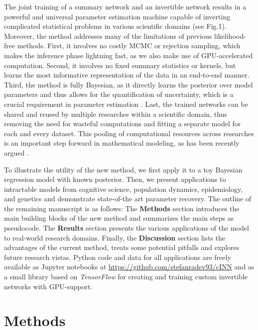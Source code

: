 \documentclass[9pt,twoside,lineno]{pnas-new}
\begin{document}
The joint training of a summary network and an invertible network results in a powerful and universal parameter estimation machine capable of inverting complicated statistical problems in various scientific domains (see Fig.1). Moreover, the method addresses many of the limitations of previous likelihood-free methods. First, it involves no costly MCMC or rejection sampling, which makes the inference phase lightning fast, as we also make use of GPU-accelerated computation. Second, it involves no fixed summary statistics or kernels, but learns the most informative representation of the data in an end-to-end manner. Third, the method is fully Bayesian, as it directly learns the posterior over model parameters and thus allows for the quantification of uncertainty, which is a crucial requirement in parameter estimation \cite{kendall2017uncertainties, gelman2013bayesian}. Last, the trained networks can be shared and reused by multiple researches within a scientific domain, thus removing the need for wasteful computations and fitting a separate model for each and every dataset. This pooling of computational resources across researches is an important step forward in mathematical modeling, as has been recently argued \cite{mestdagh2018prepaid}.

To illustrate the utility of the new method, we first apply it to a toy Bayesian regression model with known posterior. Then, we present applications to intractable models from cognitive science, population dynamics, epidemiology, and genetics and demonstrate state-of-the art parameter recovery. The outline of the remaining manuscript is as follows: The \textbf{Methods} section introduces the main building blocks of the new method and summarizes the main steps as pseudocode. The \textbf{Results} section presents the various applications of the model to real-world research domains. Finally, the \textbf{Discussion} section lists the advantages of the current method, treats some potential pitfalls and explores future research vistas. Python code and data for all applications are freely available as Jupyter notebooks at \href{https://github.com/stefanradev93/cINN}{https://github.com/stefanradev93/cINN} and as a small library based on \textit{TensorFlow} \cite{abadi2016tensorflow} for creating and training custom invertible networks with GPU-support. 

\section*{Methods}
\end{document}
